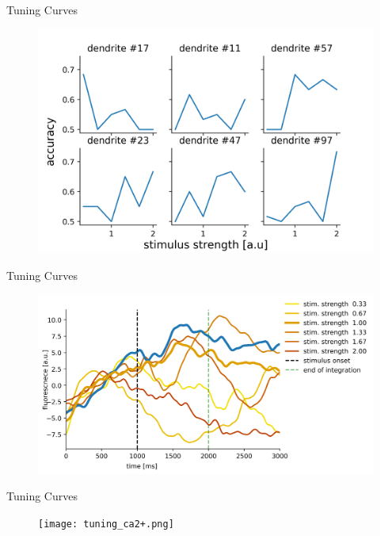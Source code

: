 \documentclass[10pt]{beamer}
\begin{document}
\begin{frame}[fragile]{Tuning Curves}
\begin{center}
	\begin{figure}
      \includegraphics[width=1.0\textwidth]{tuning.png}
	\end{figure}
	\end{center}
\end{frame}

\begin{frame}[fragile]{Tuning Curves}
\begin{center}
	\begin{figure}
      \includegraphics[width=1.0\textwidth]{tuning_ca2+single.png}
	\end{figure}
	\end{center}
\end{frame}

\begin{frame}[fragile]{Tuning Curves}
\begin{center}
	\begin{figure}
      \texttt{[image: tuning\_ca2+.png]}
	\end{figure}
	\end{center}
\end{frame}
\end{document}
